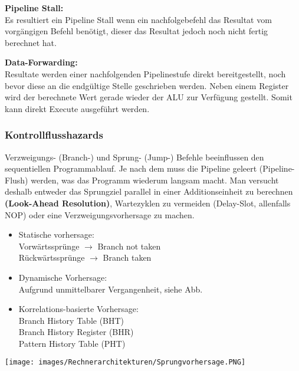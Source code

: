 \textbf{Pipeline Stall:}\\
Es resultiert ein Pipeline Stall wenn ein nachfolgebefehl das Resultat vom vorgängigen Befehl benötigt, dieser das Resultat jedoch noch nicht fertig berechnet hat.

\textbf{Data-Forwarding:}\\
Resultate werden einer nachfolgenden Pipelinestufe direkt bereitgestellt, noch bevor diese an die endgültige Stelle geschrieben werden.
Neben einem Register wird der berechnete Wert gerade wieder der ALU zur Verfügung gestellt.
Somit kann direkt Execute ausgeführt werden.
\vspace{-0.5cm}
\subsubsection{Kontrollflusshazards}
Verzweigungs- (Branch-) und Sprung- (Jump-) Befehle beeinflussen den sequentiellen Programmablauf.
Je nach dem muss die Pipeline geleert (Pipeline-Flush) werden, was das Programm wiederum langsam macht.
Man versucht deshalb entweder das Sprungziel parallel in einer Additionseinheit zu berechnen \textbf{(Look-Ahead Resolution)}, Wartezyklen zu vermeiden (Delay-Slot, allenfalls NOP) oder eine Verzweigungsvorhersage zu machen.

	
	\begin{minipage}{0.55\textwidth}
		\begin{itemize}[noitemsep,topsep=0pt]
			\item Statische vorhersage:\\
			 Vorwärtssprünge $\rightarrow$ Branch not taken\\ Rückwärtssprünge $\rightarrow$ Branch taken
			 
			 \item Dynamische Vorhersage:\\
			 Aufgrund unmittelbarer Vergangenheit, siehe Abb.
			 
			 \item Korrelations-basierte Vorhersage:\\
			 Branch History Table (BHT)\\
			 Branch History Register (BHR)\\
			 Pattern History Table (PHT)

		\end{itemize}		
	\end{minipage}	
	\begin{minipage}{0.4\textwidth} 
		\texttt{[image: images/Rechnerarchitekturen/Sprungvorhersage.PNG]}
	\end{minipage}
	

